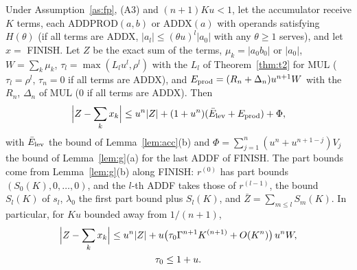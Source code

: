 \begin{theorem}\label{thm:acc}
Under Assumption~\ref{as:fp}, (A3) and $(n+1)Ku < 1$, let the accumulator
receive $K$ terms, each ADDPROD$(a, b)$ or ADDX$(a)$ with operands satisfying $H(\theta)$ (if all terms are ADDX, $|a_l|
\le (\theta u)^l|a_0|$ with any $\theta \ge 1$ serves), and let $x = $ FINISH. Let
$Z$ be the exact sum of the terms, $\mu_k = |a_0b_0|$ or $|a_0|$, $W = \sum_k\mu_k$, $\tau_l = \max(L_lu^l,
\rho^l)$ with the $L_l$ of Theorem~\ref{thm:t2} for MUL ($\tau_l = \rho^l$, $\tau_n = 0$ if all terms are ADDX), and
$E_{\rm prod} = (R_n + \Delta_n)u^{n+1}W$ with the $R_n$, $\Delta_n$ of MUL ($0$ if all terms are ADDX). Then
\[
\Bigl|Z - \sum_k x_k\Bigr| \le u^n|Z| + (1 + u^n)(\bar E_{\rm lev} + E_{\rm prod}) + \Phi,
\]
with $\bar E_{\rm lev}$ the bound of Lemma~\ref{lem:acc}(b) and $\Phi = \sum_{j=1}^{n}(u^n + u^{n+1-j})V_j$ the
bound of Lemma~\ref{lem:g}(a) for the last ADDF of FINISH. The part bounds come from Lemma~\ref{lem:g}(b) along
FINISH: $r^{(0)}$ has part bounds $(S_0(K), 0, \dots, 0)$, and the $l$-th ADDF takes those of $r^{(l-1)}$, the bound
$S_l(K)$ of $s_l$, $\lambda_0$ the first part bound plus $S_l(K)$, and $\bar Z = \sum_{m \le l}S_m(K)$. In particular, for $Ku$ bounded away from $1/(n+1)$,
\begin{gather*}
\Bigl|Z - \sum_k x_k\Bigr| \le u^n|Z| + u\bigl(\tau_0\Gamma^{n+1}K^{(n+1)} + O(K^n)\bigr)\,u^nW, \\
\tau_0 \le 1 + u.
\end{gather*}
\end{theorem}

